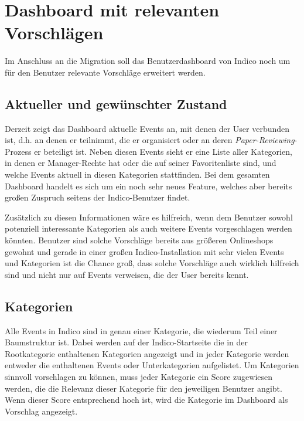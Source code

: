 \chapter{Dashboard mit relevanten Vorschlägen}

Im Anschluss an die Migration soll das Benutzerdashboard von Indico noch um für den Benutzer
relevante Vorschläge erweitert werden.


\section{Aktueller und gewünschter Zustand}

Derzeit zeigt das Dashboard aktuelle Events an, mit denen der User verbunden ist, d.h. an denen er
teilnimmt, die er organisiert oder an deren \emph{Paper-Reviewing}-Prozess er beteiligt ist. Neben
diesen Events sieht er eine Liste aller Kategorien, in denen er Manager-Rechte hat oder die auf
seiner Favoritenliste sind, und welche Events aktuell in diesen Kategorien stattfinden. Bei dem
gesamten Dashboard handelt es sich um ein noch sehr neues Feature, welches aber bereits großen
Zuspruch seitens der Indico-Benutzer findet.

Zusätzlich zu diesen Informationen wäre es hilfreich, wenn dem Benutzer sowohl potenziell
interessante Kategorien als auch weitere Events vorgeschlagen werden könnten. Benutzer sind solche
Vorschläge bereits aus größeren Onlineshops gewohnt und gerade in einer großen Indico-Installation
mit sehr vielen Events und Kategorien ist die Chance groß, dass solche Vorschläge auch wirklich
hilfreich sind und nicht nur auf Events verweisen, die der User bereits kennt.


\section{Kategorien}

Alle Events in Indico sind in genau einer Kategorie, die wiederum Teil einer Baumstruktur ist. Dabei
werden auf der Indico-Startseite die in der Rootkategorie enthaltenen Kategorien angezeigt und in
jeder Kategorie werden entweder die enthaltenen Events oder Unterkategorien aufgelistet. Um
Kategorien sinnvoll vorschlagen zu können, muss jeder Kategorie ein Score zugewiesen werden, die die
Relevanz dieser Kategorie für den jeweiligen Benutzer angibt. Wenn dieser Score entsprechend hoch
ist, wird die Kategorie im Dashboard als Vorschlag angezeigt.

